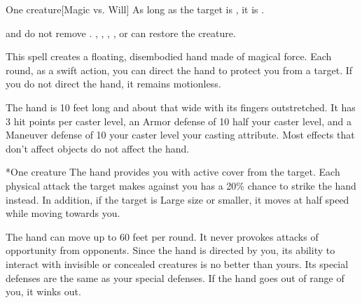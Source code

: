 \begin{spellheader}
    \spellrng{\rngclose}
\end{spellheader}
\begin{spelleffects}
    \begin{spelltarget}{One creature}[Magic vs. Will]
        \spellsuccess As long as the target is \bloodied, it is \confused.
    \end{spelltarget}
\end{spelleffects}
\begin{spellfooter}
    \spellnotes {} and  do not remove . , , , , or  can restore the creature.
\end{spellfooter}

\begin{spellheader}
    \spellrng{\rngmed}
    \spelldur{\durshort \dismissable}
\end{spellheader}
\begin{spelleffects}
    \spelleffect This spell creates a floating, disembodied hand made of magical force. Each round, as a swift action, you can direct the hand to protect you from a target. If you do not direct the hand, it remains motionless.

    The hand is 10 feet long and about that wide with its fingers outstretched. It has 3 hit points per caster level, an Armor defense of 10 \add half your caster level, and a Maneuver defense of 10 \add your caster level \add your casting attribute. Most effects that don't affect objects do not affect the hand.

    \begin{spelltarget}*{One creature}
        \spelleffect The hand provides you with active cover from the target. Each physical attack the target makes against you has a 20\% chance to strike the hand instead. In addition, if the target is Large size or smaller, it moves at half speed while moving towards you.
    \end{spelltarget}
\end{spelleffects}
\begin{spellfooter}
    \spellnotes The hand can move up to 60 feet per round. It never provokes attacks of opportunity from opponents. Since the hand is directed by you, its ability to interact with invisible or concealed creatures is no better than yours. Its special defenses are the same as your special defenses. If the hand goes out of range of you, it winks out.
\end{spellfooter}


